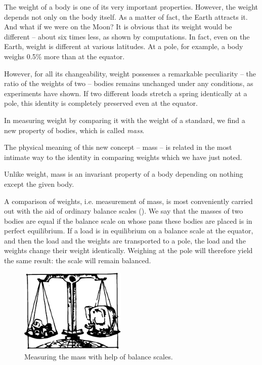 The weight of a body is one of its very important properties. However,
the weight depends not only on the body itself. As a matter of fact,
the Earth attracts it.  And what if we were on the Moon? It is
obvious that its weight would be different -- about six times less, as
shown by computations. In fact, even on the Earth, weight is different
at various latitudes. At a pole, for example, a body weighs
0.5\% more than at the equator.

However, for all its changeability, weight possesses a remarkable
peculiarity -- the ratio of the weights of two -- bodies remains
unchanged under any conditions, as experiments have shown. If two
different loads stretch a spring identically at a pole, this identity
is completely preserved even at the equator.

In measuring weight by comparing it with the weight of a standard, we
find a new property of bodies, which is called \emph{mass}.

The physical meaning of this new concept -- mass -- is related in the most
intimate way to the identity in comparing weights which we have
just noted.

Unlike weight, mass is an invariant property of a body depending on
nothing except the given body.  

A comparison of weights, i.e. measurement of mass, is most
conveniently carried out with the aid of ordinary balance scales
(). We say that the masses of
two bodies are equal if the balance scale on whose pans these bodies
are placed is in perfect equilibrium. If a load is in equilibrium on a
balance scale at the equator, and then the load and the weights are
transported to a pole, the load and the weights change their weight
identically. Weighing at the pole will therefore yield the same
result: the scale will remain balanced.

\begin{figure}
\centering
\includegraphics[width=0.45\textwidth]{figures/fig-01-03.pdf}
\caption{Measuring the mass with help of balance scales.}
\label{fig-1.3}
\end{figure}

